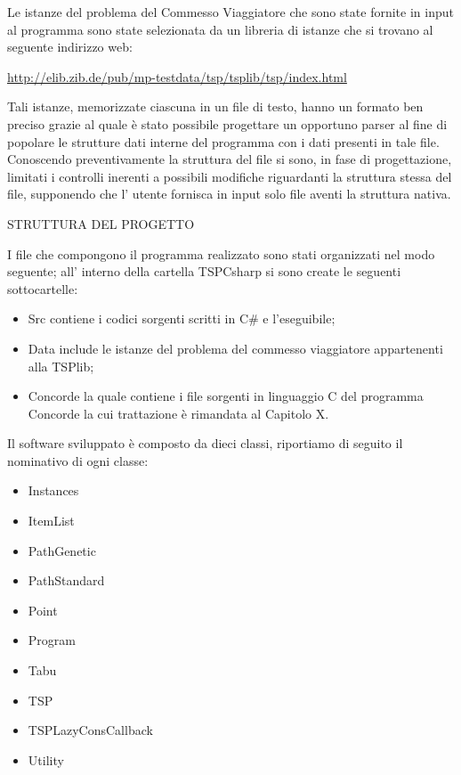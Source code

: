 \documentclass[11pt]{article}
\begin{document}
Le istanze del problema del Commesso Viaggiatore che sono state fornite in input al programma sono state selezionata da un libreria di istanze che si trovano al seguente indirizzo web: 

\begin{center}
\href{http://elib.zib.de/pub/mp-testdata/tsp/tsplib/tsp/index.html}{http://elib.zib.de/pub/mp-testdata/tsp/tsplib/tsp/index.html}
\end{center}

Tali istanze, memorizzate ciascuna in un file di testo, hanno un formato ben preciso grazie al quale \`e stato possibile progettare un opportuno parser al fine di popolare le strutture dati interne del programma con i dati presenti in tale file.
Conoscendo preventivamente la struttura del file si sono, in fase di progettazione, limitati i controlli inerenti a possibili modifiche riguardanti la struttura stessa del file, supponendo che l' utente fornisca in input solo file aventi la struttura nativa. 

\vspace{2\baselineskip}



\vspace{2\baselineskip}
STRUTTURA DEL PROGETTO
\vspace{2\baselineskip}


I file che compongono il programma realizzato sono stati organizzati nel modo seguente; all' interno della cartella TSPCsharp si sono create le seguenti sottocartelle:

\begin{itemize}
\item Src contiene i codici sorgenti scritti in C\# e l'eseguibile;
\item Data include le istanze del problema del commesso viaggiatore appartenenti alla TSPlib;
\item Concorde la quale contiene i file sorgenti in  linguaggio C del programma Concorde la cui trattazione \`e rimandata al Capitolo X.
\end{itemize}

Il software sviluppato \`e composto da dieci classi, riportiamo di seguito il nominativo di ogni classe:

\begin{itemize}
\item Instances
\item ItemList
\item PathGenetic
\item PathStandard
\item Point
\item Program
\item Tabu
\item TSP
\item TSPLazyConsCallback
\item Utility
\end{itemize}
\end{document}
